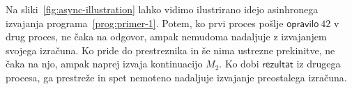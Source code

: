 Na sliki~\ref{fig:async-illustration} lahko vidimo ilustrirano idejo asinhronega izvajanja programa~\ref{prog:primer-1}. 
Potem, ko prvi proces pošlje $\mathsf{opravilo}\ 42$ v drug proces, ne čaka na odgovor, ampak nemudoma nadaljuje z izvajanjem svojega izračuna. Ko pride do prestreznika in še nima ustrezne prekinitve, ne čaka na njo, ampak naprej izvaja kontinuacijo $M_2$. Ko dobi $\mathsf{rezultat}$ iz drugega procesa, ga prestreže in spet nemoteno nadaljuje izvajanje preostalega izračuna.

%	

